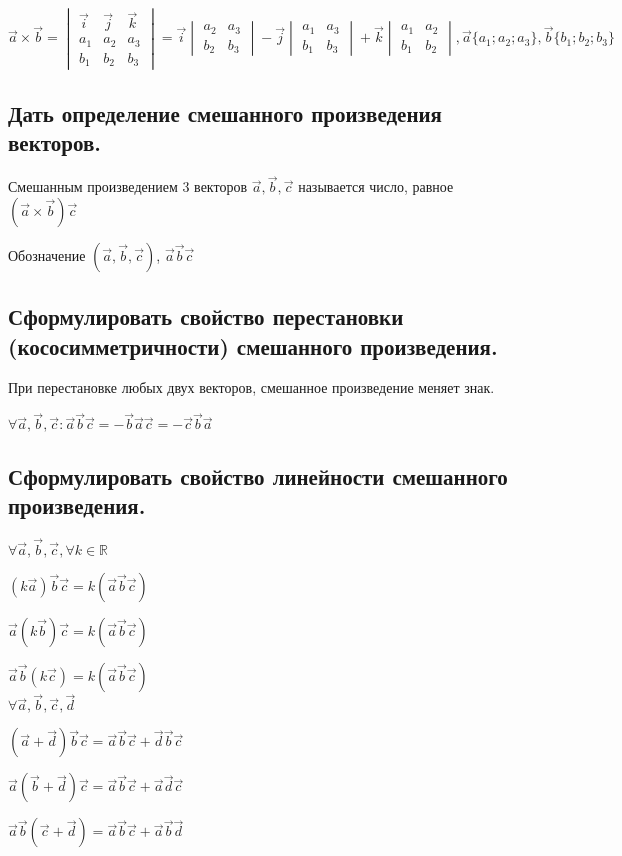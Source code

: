 \documentclass[a4paper, 10pt]{article}
\renewcommand{\a}{\vec{a}}
\renewcommand{\b}{\vec{b}}
\renewcommand{\c}{\vec{c}}
\renewcommand{\d}{\vec{d}}
\renewcommand{\i}{\vec{i}}
\renewcommand{\j}{\vec{j}}
\renewcommand{\k}{\vec{k}}
\begin{document}
\begin{center}
$\a \times \b = 
\begin{vmatrix}
    \i&\j&\k\\
    a_1 & a_2 & a_3\\
    b_1 & b_2 & b_3
\end{vmatrix} = \i
\begin{vmatrix}
    a_2 & a_3\\
    b_2 & b_3
\end{vmatrix} - \j
\begin{vmatrix}
    a_1 & a_3\\
    b_1 & b_3
\end{vmatrix} + \k
\begin{vmatrix}
    a_1 & a_2\\
    b_1 & b_2
\end{vmatrix}, \a\{a_1;a_2;a_3\},\b\{b_1;b_2;b_3\}$
\end{center}

\subsection{Дать определение смешанного произведения векторов.}

Смешанным произведением 3 векторов $\a, \b, \c$ называется число, равное 
$(\a \times \b) \c$

Обозначение $(\a, \b, \c)$, $\a \b \c$

\subsection{Сформулировать свойство перестановки (кососимметричности) смешанного произведения.}

При перестановке любых двух векторов, смешанное произведение меняет знак.

$\forall \a, \b, \c:\a \b \c = - 
\b \a \c = - \c \b \a$

\subsection{Сформулировать свойство линейности смешанного произведения.}

\begin{center}
$\forall \a, \b, \c, \forall k \in \mathbb{R}$

$(k\a)\b\c = k(\a\b\c)$

$\a(k\b)\c = k(\a\b\c)$

$\a\b(k\c) = k(\a\b\c)$\\

$\forall \a, \b, \c, \d$

$(\a+\d)\b\c = \a\b\c + \d\b\c$

$\a(\b+\d)\c = \a\b\c + \a\d\c$

$\a\b(\c+\d) = \a\b\c + \a\b\d$
\end{center}
\end{document}
